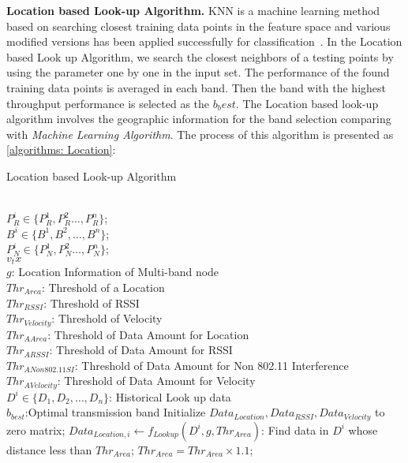 {\bf Location based Look-up Algorithm.} KNN is a machine learning method
based on searching closest training data points in the feature space and various
modified versions has been applied successfully for classification~\cite{zhang2006svm}.
In the Location based Look up Algorithm, we search the closest neighbors of 
a testing points by using the parameter one by one in the input set. The 
performance of the found training data points is averaged in each band. Then
the band with the highest throughput performance is selected as the $b_best$.
The Location based look-up algorithm involves the geographic information 
for the band selection comparing with \emph{Machine Learning Algorithm}. 
The process of this algorithm is presented as \ref{algorithms: Location}:
	  \begin{algorithm}
	  \caption{Location based Look-up Algorithm}
	  \label{algorithms: Location}
	  \begin{algorithmic}[1]
	  \REQUIRE  ~~\\
		  $P_R^i \in \{P_R^1,P_R^2 \dots,P_R^n\}$;\\
		  $B^i \in \{B^1,B^2, \dots, B^n\}$;\\
		  $P_N^i \in \{P_N^1,P_N^2 \dots,P_N^n\}$;\\
		  $v_tx$\\
		  $g$: Location Information of Multi-band node\\
		  $Thr_{Area}$: Threshold of a Location\\
		  $Thr_{RSSI}$: Threshold of RSSI\\
		  $Thr_{Velocity}$: Threshold of Velocity\\
		  $Thr_{A Area}$: Threshold of Data Amount for Location\\
		  $Thr_{A RSSI}$: Threshold of Data Amount for RSSI\\
		  $Thr_{A Non 802.11 SI}$: Threshold of Data Amount for Non 802.11 Interference\\
		  $Thr_{A Velocity}$: Threshold of Data Amount for Velocity\\
		  $D^i \in \{D_1,D_2,\dots,D_n\}$: Historical Look up data
\ENSURE ~~\\    
$b_{best}$:Optimal transmission band
\STATE Initialize \emph{$Data_{Location},Data_{RSSI},Data_{Velocity}$} to zero matrix;
\STATE $Data_{Location,i} \leftarrow f_{Lookup}(D^i,g,Thr_{Area})$: Find data in $D^i$ whose distance less than $Thr_{Area}$;
\STATE $Thr_{Area}=Thr_{Area} \times 1.1$;
\ENDWHILE


\end{algorithmic}
\end{algorithm}
